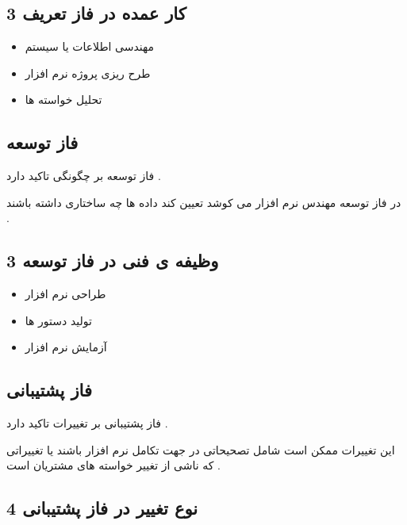 \documentclass{article}
\begin{document}
\subsection{3 کار عمده در فاز تعریف}

\begin{itemize}
	\item مهندسی اطلاعات یا سیستم
	\item طرح ریزی پروژه نرم افزار
	\item تحلیل خواسته ها
\end{itemize}



\subsection{ فاز توسعه}

فاز توسعه بر چگونگی تاکید دارد .

در فاز توسعه مهندس نرم افزار می کوشد تعیین کند داده ها چه ساختاری داشته باشند .


\subsection{3 وظیفه ی فنی در فاز توسعه}

\begin{itemize}
	\item طراحی نرم افزار
	\item تولید دستور ها
	\item آزمایش نرم افزار
\end{itemize}


\subsection{ فاز پشتیبانی}

فاز پشتیبانی بر تغییرات تاکید دارد .

این تغییرات  ممکن است شامل تصحیحاتی در جهت تکامل نرم افزار باشند یا تغییراتی که ناشی از تغییر خواسته های مشتریان است . 

\subsection{4 نوع تغییر در فاز پشتیبانی}
\end{document}
